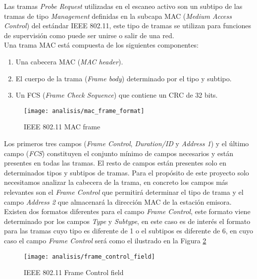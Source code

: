 \documentclass[../proyecto.tex]{subfiles}
\begin{document}
Las tramas \textit{Probe Request} utilizadas en el escaneo activo son un subtipo de las tramas de tipo \textit{Management} definidas en la subcapa MAC (\textit{Medium Access Control}) del estándar IEEE 802.11, este tipo de tramas se utilizan para funciones de supervisión como puede ser unirse o salir de una red.\\

Una trama MAC está compuesta de los siguientes componentes:
\begin{enumerate}
  \item Una cabecera MAC (\textit{MAC header}).
  \item El cuerpo de la trama (\textit{Frame body}) determinado por el tipo y subtipo.
  \item Un FCS (\textit{Frame Check Sequence}) que contiene un CRC de 32 bits.
\end{enumerate}

\begin{figure}[H]
\centering
\texttt{[image: analisis/mac\_frame\_format]}
\caption{IEEE 802.11 MAC frame}
\label{fig:ieee80211_mac_frame}
\end{figure}

Los primeros tres campos (\textit{Frame Control}, \textit{Duration/ID} y \textit{Address 1}) y el último campo (\textit{FCS}) constituyen el conjunto mínimo de campos necesarios y están presentes en todas las tramas. El resto de campos están presentes solo en determinados tipos y subtipos de tramas. Para el propósito de este proyecto solo necesitamos analizar la cabecera de la trama, en concreto los campos más relevantes son el \textit{Frame Control} que permitirá determinar el tipo de trama y el campo \textit{Address 2} que almacenará la dirección MAC de la estación emisora.\\

Existen dos formatos diferentes para el campo \textit{Frame Control}, este formato viene determinado por los campos \textit{Type} y \textit{Subtype}, en este caso es de interés el formato para las tramas cuyo tipo es diferente de 1 o el subtipos es diferente de 6, en cuyo caso el campo \textit{Frame Control} será como el ilustrado en la Figura \ref{fig:ieee80211_frame_control_field}

\begin{figure}[H]
\centering
\texttt{[image: analisis/frame\_control\_field]}
\caption{IEEE 802.11 Frame Control field}
\label{fig:ieee80211_frame_control_field}
\end{figure}
\end{document}

